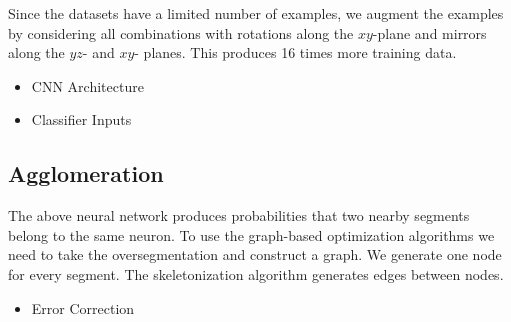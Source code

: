 Since the datasets have a limited number of examples, we augment the examples by considering all combinations with rotations along the $xy$-plane and mirrors along the $yz$- and $xy$- planes. This produces 16 times more training data.

\begin{itemize}
	\item CNN Architecture
	\item Classifier Inputs
\end{itemize}

\subsection{Agglomeration}

The above neural network produces probabilities that two nearby segments belong to the same neuron. To use the graph-based optimization algorithms we need to take the oversegmentation and construct a graph. We generate one node for every segment. The skeletonization algorithm generates edges between nodes. 

\begin{itemize}
	\item Error Correction
\end{itemize}
